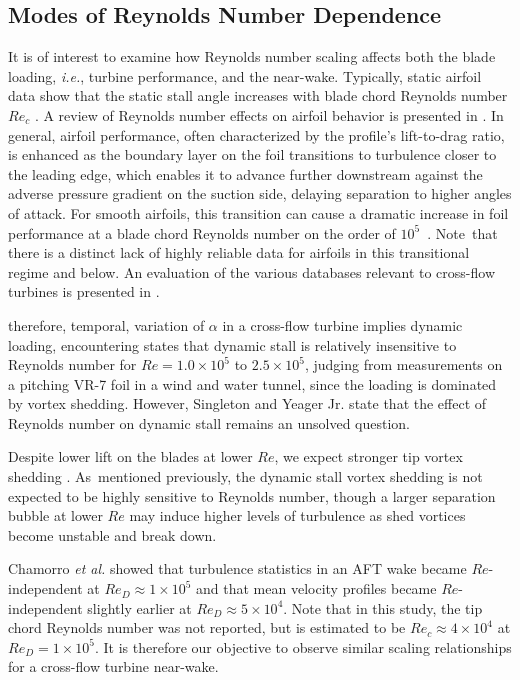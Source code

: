 \documentclass[energies,article,accept,moreauthors,pdftex,10pt,a4paper]{mdpi}
\theoremstyle{mdpi}
\newcounter{ex}
\newcounter{re}
\begin{document}
\subsection{Modes of Reynolds Number Dependence}

It is of interest to examine how Reynolds number scaling affects both the blade
loading, \emph{i.e.}, turbine performance, and the near-wake. Typically, static
airfoil data show that the static stall angle increases with blade chord
Reynolds number $Re_c$ \cite{Jacobs1937}. A review of Reynolds number effects on
airfoil behavior is presented in \cite{Lissaman1983}. In general, airfoil
performance, often characterized by the profile's lift-to-drag ratio, is
enhanced as the boundary layer on the foil transitions to turbulence closer to
the leading edge, which enables it to advance further downstream against the
adverse pressure gradient on the suction side, delaying separation to higher
angles of attack. For smooth airfoils, this transition can cause a dramatic
increase in foil performance at a blade chord Reynolds number on the order of
\mbox{$10^5$ \cite{McMasters1980}}. Note~that there is a distinct lack of highly
reliable data for airfoils in this transitional regime and below. An evaluation
of the various databases relevant to cross-flow turbines is presented in
\cite{Bedon2014}.

 therefore, temporal, variation of $\alpha$ in a cross-flow
turbine implies dynamic loading, encountering  states that dynamic stall is relatively
insensitive to Reynolds number for $Re=1.0 \times 10^5$ to $2.5 \times
10^5$, judging from measurements on a pitching VR-7 foil in a wind and water
tunnel, since the loading is dominated by vortex shedding. However, Singleton
and Yeager Jr. \cite{Singleton2000} state that the effect of Reynolds number on
dynamic stall remains an unsolved question.

Despite lower lift on the blades at lower $Re$, we expect stronger tip vortex
shedding \cite{Yoon2005}. As~mentioned previously, the dynamic stall vortex
shedding is not expected to be highly sensitive to Reynolds number, though a
larger separation bubble at lower $Re$ may induce higher levels of turbulence as
shed vortices become unstable and break down. 

Chamorro \emph{et al.} \cite{Chamorro2012} showed that turbulence statistics in an AFT%
wake became $Re$-independent at $Re_D \approx 1 \times 10^5$ and that mean
velocity profiles became $Re$-independent slightly earlier at $Re_D \approx 5
\times 10^4$. Note that in this study, the tip chord Reynolds number was not
reported, but is estimated to be $Re_c \approx 4 \times 10^4$ at $Re_D=1 \times
10^5$. It is therefore our objective to observe similar scaling relationships
for a cross-flow turbine near-wake.
\end{document}

